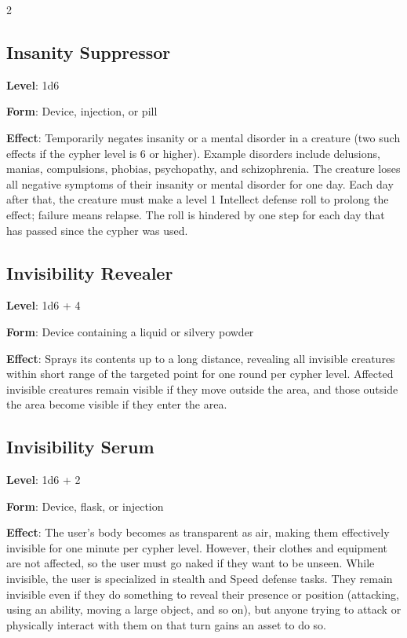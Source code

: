 \begin{multicols}{2}
\subsection{Insanity Suppressor}

\textbf{Level}: 1d6

\textbf{Form}: Device, injection, or pill

\textbf{Effect}: Temporarily negates insanity or a mental disorder in a creature (two such effects if the cypher level is 6 or higher). Example disorders include delusions, manias, compulsions, phobias, psychopathy, and schizophrenia. The creature loses all negative symptoms of their insanity or mental disorder for one day. Each day after that, the creature must make a level 1 Intellect defense roll to prolong the effect; failure means relapse. The roll is hindered by one step for each day that has passed since the cypher was used.

\subsection{Invisibility Revealer}

\textbf{Level}: 1d6 + 4

\textbf{Form}: Device containing a liquid or silvery powder

\textbf{Effect}: Sprays its contents up to a long distance, revealing all invisible creatures within short range of the targeted point for one round per cypher level. Affected invisible creatures remain visible if they move outside the area, and those outside the area become visible if they enter the area.

\subsection{Invisibility Serum}

\textbf{Level}: 1d6 + 2

\textbf{Form}: Device, flask, or injection 

\textbf{Effect}: The user’s body becomes as transparent as air, making them effectively invisible for one minute per cypher level. However, their clothes and equipment are not affected, so the user must go naked if they want to be unseen. While invisible, the user is specialized in stealth and Speed defense tasks. They remain invisible even if they do something to reveal their presence or position (attacking, using an ability, moving a large object, and so on), but anyone trying to attack or physically interact with them on that turn gains an asset to do so.


\end{multicols}
